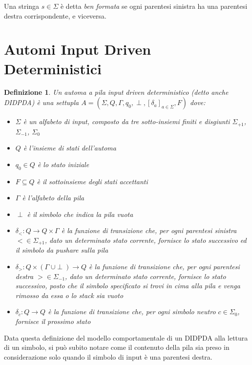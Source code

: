 \documentclass[a4paper,12pt]{report}
\newtheorem{definition}{Definizione}[chapter]
\begin{document}
    Una stringa $s \in \Sigma$ è detta \textit{ben formata} se ogni parentesi sinistra ha una parentesi destra corrispondente, e viceversa.

    \section{Automi Input Driven Deterministici}

    \begin{definition}
        Un \textit{automa a pila input driven deterministico} (detto anche DIDPDA) è una settupla $A = (\Sigma, Q, \Gamma, q_0, \perp, \left[ \delta_a \right]_{a \in \Sigma}, F)$ dove:
        \begin{itemize}
            \item $\Sigma$ è un alfabeto di input, composto da tre sotto-insiemi finiti e disgiunti $\Sigma_{+1}$, $\Sigma_{-1}$, $\Sigma_{0}$
            \item $Q$ è l'insieme di stati dell'automa
            \item $q_{0} \in Q$ è lo stato iniziale
            \item $F \subseteq Q$ è il sottoinsieme degli stati \textit{accettanti}
            \item $\Gamma$ è  l'\textit{alfabeto della pila}
            \item $\perp$ è il simbolo che indica la pila vuota
            \item $\delta_{<} : Q \rightarrow Q \times \Gamma$ è la funzione di transizione che, per ogni parentesi sinistra $< \in \Sigma_{+1}$, dato un determinato stato corrente, fornisce lo stato successivo ed il simbolo da pushare sulla pila
            \item $\delta_{>} : Q \times (\Gamma\;\cup\perp) \rightarrow Q$ è la funzione di transizione che, per ogni parentesi destra $> \in \Sigma_{-1}$, dato un determinato stato corrente, fornisce lo stato successivo, posto che il simbolo specificato si trovi in cima alla pila e venga rimosso da essa o lo stack sia vuoto
            \item $\delta_{c} : Q \rightarrow Q$ è la funzione di transizione che, per ogni simbolo neutro $c \in \Sigma_{0}$, fornisce il prossimo stato
        \end{itemize}
    \end{definition}

    Data questa definizione del modello comportamentale di un DIDPDA alla lettura di un simbolo, si può subito notare come il contenuto della pila
    sia preso in considerazione solo quando il simbolo di input è una parentesi destra. 
    
\end{document}
